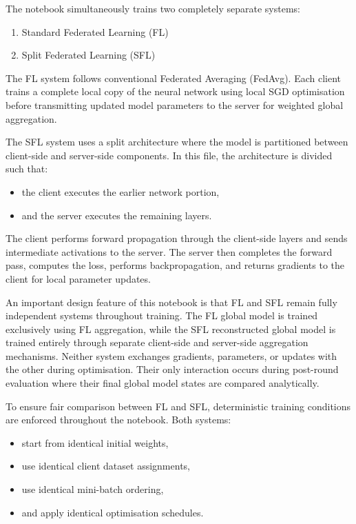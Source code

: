 The notebook simultaneously trains two completely separate systems:

\begin{enumerate}
    \item Standard Federated Learning (FL)
    \item Split Federated Learning (SFL)
\end{enumerate}

The FL system follows conventional Federated Averaging (FedAvg). Each client trains a complete local copy of the neural network using local SGD optimisation before transmitting updated model parameters to the server for weighted global aggregation.

The SFL system uses a split architecture where the model is partitioned between client-side and server-side components. In this file, the architecture is divided such that:
\begin{itemize}
    \item the client executes the earlier network portion,
    \item and the server executes the remaining layers.
\end{itemize}

The client performs forward propagation through the client-side layers and sends intermediate activations to the server. The server then completes the forward pass, computes the loss, performs backpropagation, and returns gradients to the client for local parameter updates.

An important design feature of this notebook is that FL and SFL remain fully independent systems throughout training. The FL global model is trained exclusively using FL aggregation, while the SFL reconstructed global model is trained entirely through separate client-side and server-side aggregation mechanisms. Neither system exchanges gradients, parameters, or updates with the other during optimisation. Their only interaction occurs during post-round evaluation where their final global model states are compared analytically.

To ensure fair comparison between FL and SFL, deterministic training conditions are enforced throughout the notebook. Both systems:
\begin{itemize}
    \item start from identical initial weights,
    \item use identical client dataset assignments,
    \item use identical mini-batch ordering,
    \item and apply identical optimisation schedules.
\end{itemize}

